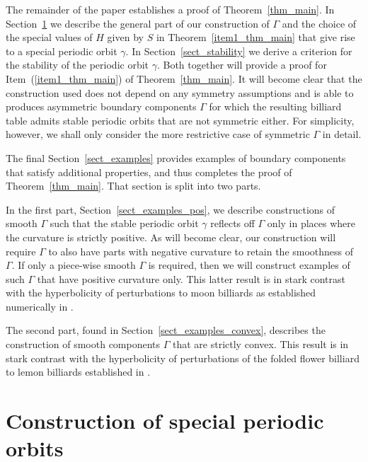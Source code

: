 \documentclass{amsart}
\theoremstyle{plain} %
\begin{document}
The remainder of the paper establishes a proof of Theorem~\ref{thm_main}.
In Section~\ref{sect_construction} we describe the general part of
our construction of $\Gamma$ and the choice of the special
values of $H$ given by $S$ in Theorem~\ref{item1_thm_main} that give
rise to a special periodic orbit $\gamma$.
In Section~\ref{sect_stability} we derive a criterion for the
stability of the periodic orbit $\gamma$.
Both together will provide a proof for Item~(\ref{item1_thm_main}) of
Theorem~\ref{thm_main}. It will become clear that the construction used
does not depend on any symmetry assumptions and is able to produces
asymmetric boundary components $\Gamma$ for which the resulting
billiard table admits stable periodic orbits that are not symmetric either.
For simplicity, however, we shall only consider the more restrictive case
of symmetric $\Gamma$ in detail.

The final Section~\ref{sect_examples} provides examples of boundary
components that satisfy additional properties, and thus completes
the proof of Theorem~\ref{thm_main}. That section is
split into two parts.

In the first part, Section~\ref{sect_examples_pos},
we describe constructions of smooth $\Gamma$ such that
the stable periodic orbit $\gamma$ reflects off $\Gamma$
only in places where the curvature is strictly positive. As will become
clear, our construction will require $\Gamma$ to also
have parts with negative curvature to retain the smoothness of
$\Gamma$. If only a piece-wise smooth $\Gamma$
is required, then we will construct examples of such $\Gamma$
that have positive curvature only.
This latter result is in stark contrast with the hyperbolicity
of perturbations to moon billiards as established numerically in
\cite{MR3456006}.

The second part, found in Section~\ref{sect_examples_convex},
describes the construction of smooth components $\Gamma$ that are
strictly convex.
This result is in stark contrast with the hyperbolicity
of perturbations of the folded flower billiard
to lemon billiards established in \cites{MR3452271,MR4183371}.





\section{Construction of special periodic orbits}

\label{sect_construction}
\end{document}

